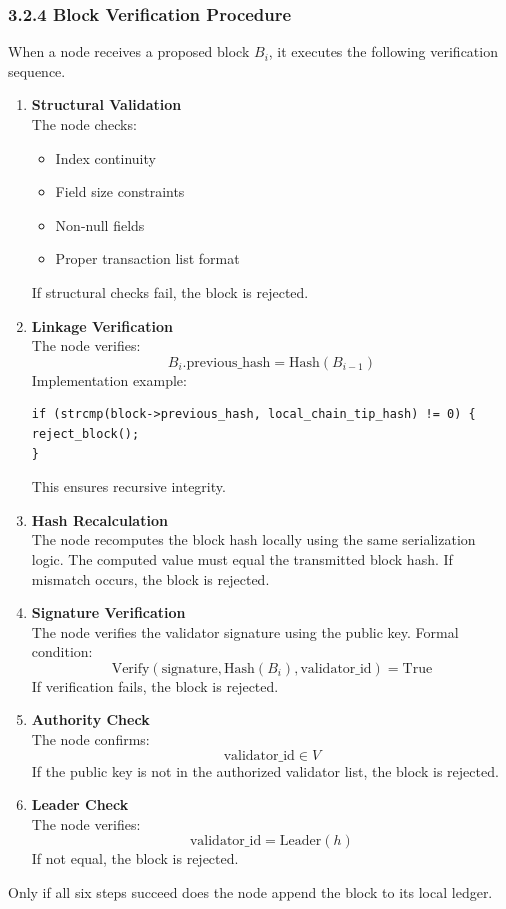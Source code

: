\subsubsection*{3.2.4 Block Verification Procedure}
When a node receives a proposed block $B_i$, it executes the following verification sequence.
\begin{enumerate}
\item \textbf{Structural Validation}\\
The node checks:
\begin{itemize}
\item Index continuity
\item Field size constraints
\item Non-null fields
\item Proper transaction list format
\end{itemize}
If structural checks fail, the block is rejected.

\item \textbf{Linkage Verification}\\
The node verifies:
\[
B_i.\text{previous\_hash} = \mathrm{Hash}(B_{i-1})
\]
Implementation example:
\begin{verbatim}
if (strcmp(block->previous_hash, local_chain_tip_hash) != 0) {
reject_block();
}
\end{verbatim}
This ensures recursive integrity.

\item \textbf{Hash Recalculation}\\
The node recomputes the block hash locally using the same serialization logic. The computed value must equal the transmitted block hash.
If mismatch occurs, the block is rejected.
\item \textbf{Signature Verification}\\
The node verifies the validator signature using the public key.
Formal condition:
\[
\mathrm{Verify}(\text{signature}, \mathrm{Hash}(B_i), \text{validator\_id}) = \text{True}
\]
If verification fails, the block is rejected.

\item \textbf{Authority Check}\\
The node confirms:
\[
\text{validator\_id} \in V
\]
If the public key is not in the authorized validator list, the block is rejected.

\item \textbf{Leader Check}\\
The node verifies:
\[
\text{validator\_id} = \mathrm{Leader}(h)
\]
If not equal, the block is rejected.
\end{enumerate}
Only if all six steps succeed does the node append the block to its local ledger.

